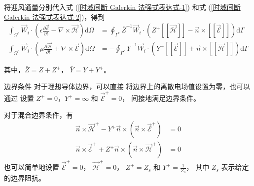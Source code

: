 \par 将迎风通量分别代入式 (\ref{时域间断 Galerkin 法强式表达式-1}) 
和式 (\ref{时域间断 Galerkin 法强式表达式-2})，得到
\begin{align}
    \int_{\Omega^e}\vec{W}_i\cdot\left(
        \epsilon\frac{\partial\vec{\mathscr{E}}}{\partial t}
        -\nabla\times\vec{\mathscr{H}}
    \right)\text{d}\Omega
    &=\oint_{\Gamma^e}
    \bar{Z}^{-1}\vec{W}_i\cdot\left(
        Z^+[\![\vec{\mathscr{H}}]\!]
        -\vec{n}\times[\![\vec{\mathscr{E}}]\!]
    \right)
    \text{d}\Gamma\\
    \int_{\Omega^e}\vec{W}_i\cdot\left(
        \mu\frac{\partial\vec{\mathscr{H}}}{\partial t}
        +\nabla\times\vec{\mathscr{E}}
    \right)\text{d}\Omega
    &=-\oint_{\Gamma^e}
    \bar{Y}^{-1}\vec{W}_i\cdot\left(
        Y^+[\![\vec{\mathscr{E}}]\!]
        +\vec{n}\times[\![\vec{\mathscr{H}}]\!]
    \right)
    \text{d}\Gamma
\end{align}
\par 其中，$\bar{Z}=Z+Z^+$，
$\bar{Y}=Y+Y^+$。

\begin{definition}{边界条件}
    对于理想导体边界，可以直接
    将边界上的离散电场值设置为零，也可以通过
    设置 $Z^+=0$，$Y^+=\infty$ 和 $\vec{\mathscr{E}}^+=0$，
    间接地满足边界条件。

    对于混合边界条件，有
    \begin{align}
        \vec{n}\times\vec{\mathscr{H}}^+
        -Y^+\vec{n}\times
        (\vec{n}\times\vec{\mathscr{E}}^+)&=0\\
        \vec{n}\times\vec{\mathscr{E}}^+
        +Z^+\vec{n}\times
        (\vec{n}\times\vec{\mathscr{H}}^+)&=0
    \end{align}
    也可以简单地设置
    $\vec{\mathscr{E}}^+=0$，
    $\vec{\mathscr{H}}^+=0$，
    $Z^+=Z_s$ 和 $Y^+=\frac{1}{Z_s}$，
    其中 $Z_s$ 表示给定的边界阻抗。
\end{definition}

